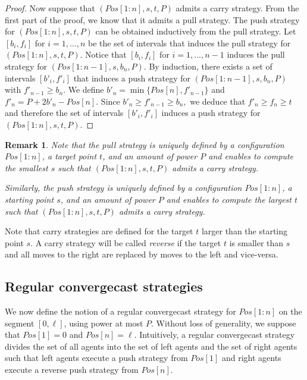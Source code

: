 \documentclass{article}
\newtheorem{remark}{Remark}
\newcommand\subproblem{carry\xspace}
\begin{document}
\begin{proof}
\medskip

Now suppose that $(Pos[1:n],s,t,P)$ admits a \subproblem strategy. 
From the first part of the proof, we know that it admits a pull strategy.
The push strategy for $(Pos[1:n],s,t,P)$ can
be obtained inductively from the pull strategy. 
Let $[b_i,f_i]$ for $i=1,...,n$ be the set 
of intervals that induces the pull strategy for 
$(Pos[1:n],s,t,P).$ Notice that $[b_i,f_i]$ for $i=1,...,n-1$ 
induces the pull strategy for $(Pos[1:n-1],s,b_n,P).$ 
By induction, there exists a set of intervals $[b'_i,f'_i]$ that 
induces a push strategy for $(Pos[1:n-1],s,b_n,P)$ 
with $f'_{n-1}\ge b_n.$ We define $b'_n = \min\{Pos[n],f'_{n-1}\}$ 
and $f'_n = P + 2b'_n - Pos[n].$ Since $b'_n\ge f'_{n-1} \ge b_n,$ 
we deduce that $f'_n \ge f_n \ge t$ and therefore the set of intervals
$[b'_i,f'_i]$ induces a push strategy for 
$(Pos[1:n],s,t,P)$.  
\end{proof}

\begin{remark}\label{rem-pull-push}
Note that the pull strategy is uniquely defined by a configuration
$Pos[1:n]$, a target point $t$, and an amount of power $P$ and enables
to compute the smallest $s$ such that $(Pos[1:n],s,t,P)$ admits a
\subproblem strategy.

Similarly, the push strategy is uniquely defined by a configuration
$Pos[1:n]$, a starting point $s$, and an amount of power $P$ and enables
to compute the largest $t$ such that $(Pos[1:n],s,t,P)$ admits a
\subproblem strategy.
\end{remark}

Note that carry strategies are defined for the target $t$ larger than the starting point $s$. A carry strategy will be called \emph{reverse} if the target $t$ is smaller than $s$ and all moves to the right are replaced by moves to the left and vice-versa.


\subsection{Regular convergecast strategies}

We now define the notion of a regular convergecast strategy for $Pos[1:n]$ on the segment $[0,\ell]$, using power at most $P$. 
Without loss of generality, we suppose that $Pos[1]=0$ and $Pos[n]=\ell$. Intuitively, a regular convergecast strategy divides the set of all agents into the set of left agents and the set of right agents such that left agents execute a push strategy from $Pos[1]$ and right agents execute a reverse push strategy from $Pos[n]$.
\end{document}
